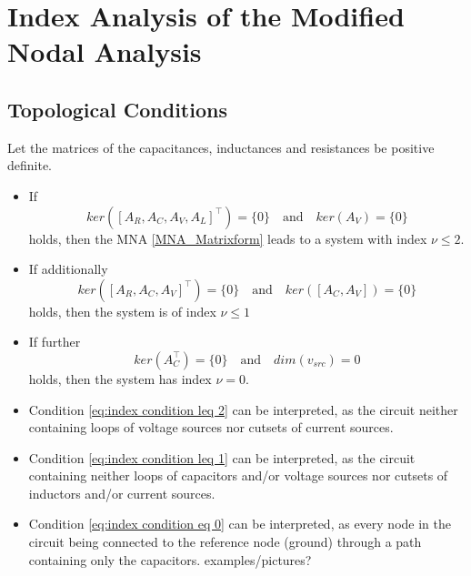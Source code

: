 \section*{Index Analysis of the Modified Nodal Analysis}
	\subsection{Topological Conditions}
	\begin{frame}
		\begin{theorem}[Index conditions] %
			Let the matrices of the capacitances, inductances and resistances be positive definite.
			\begin{itemize}
				\item If
				\begin{equation}
					\label{eq:index condition leq 2}
					ker([A_R, A_C, A_V, A_L]^\top) = \{0\} \quad \text{and} \quad ker(A_V) = \{0\}
				\end{equation}
				holds, then the MNA \eqref{MNA_Matrixform} leads to a system with index $\nu \leq 2$.
				
				\item If additionally
				\begin{equation}
					\label{eq:index condition leq 1}
					ker([A_R, A_C, A_V]^\top) = \{0\} \quad \text{and} \quad ker([A_C, A_V]) = \{0\}
				\end{equation}
				holds, then the system is of index $\nu \leq 1$
				
				\item If further
				\begin{equation}
					\label{eq:index condition eq 0}
					ker(A_C^\top) = \{0\} \quad \text{and} \quad dim(v_{src}) = 0
				\end{equation}
				holds, then the system has index $\nu = 0$.
			\end{itemize}
		\end{theorem}
	\end{frame}
	\begin{frame}
		\begin{itemize}
			\vfill
			\item Condition \eqref{eq:index condition leq 2} can be interpreted, as the circuit neither containing loops of voltage sources nor cutsets of current sources.
			\item Condition \eqref{eq:index condition leq 1} can be interpreted, as the circuit containing neither loops of capacitors and/or voltage sources nor cutsets of inductors and/or current sources.
			\item Condition \eqref{eq:index condition eq 0} can be interpreted, as every node in the circuit being connected to the reference node (ground) through a path containing only the capacitors.
			\vfill
			examples/pictures?
			\vfill
		\end{itemize}
	\end{frame}

